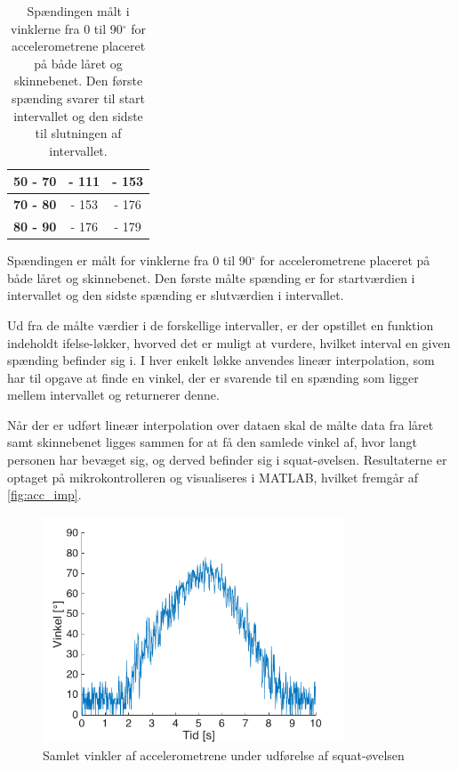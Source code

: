 \begin{table}[H]
\begin{tabular}{lcc}
\multicolumn{1}{|c|}{\textbf{50 - 70}} & \multicolumn{1}{c|}{- 111}                                         & \multicolumn{1}{c|}{- 153}                 \\ \hline
\multicolumn{1}{|c|}{\textbf{70 - 80}}  & \multicolumn{1}{c|}{- 153}                                         & \multicolumn{1}{c|}{- 176}                 \\ \hline
\multicolumn{1}{|c|}{\textbf{80 - 90}}  & \multicolumn{1}{c|}{- 176}                                         & \multicolumn{1}{c|}{- 179}                 \\ \hline
\end{tabular}
\caption{Spændingen målt i vinklerne fra 0 til 90$^{\circ}$ for accelerometrene placeret på både låret og skinnebenet. Den første spænding svarer til start intervallet og den sidste til slutningen af intervallet.}
\label{tab:vinkelinterval_psoc}  
\end{table}

\noindent
Spændingen er målt for vinklerne fra 0 til 90$^{\circ}$ for accelerometrene placeret på både låret og skinnebenet. Den første målte spænding er for startværdien i intervallet og den sidste spænding er slutværdien i intervallet.

Ud fra de målte værdier i de forskellige intervaller, er der opstillet en funktion indeholdt ifelse-løkker, hvorved det er muligt at vurdere, hvilket interval en given spænding befinder sig i. I hver enkelt løkke anvendes lineær interpolation, som har til opgave at finde en vinkel, der er svarende til en spænding som ligger mellem intervallet og returnerer denne. 

Når der er udført lineær interpolation over dataen skal de målte data fra låret samt skinnebenet ligges sammen for at få den samlede vinkel af, hvor langt personen har bevæget sig, og derved befinder sig i squat-øvelsen. Resultaterne er optaget på mikrokontrolleren og visualiseres i MATLAB, hvilket fremgår af \autoref{fig:acc_imp}.
 

\begin{figure}[H]
\centering
\includegraphics[width=0.8\textwidth]{figures/Pilotforsoeg/accvinkel}
\caption{Samlet vinkler af accelerometrene under udførelse af squat-øvelsen}
\label{fig:acc_imp}
\end{figure}



